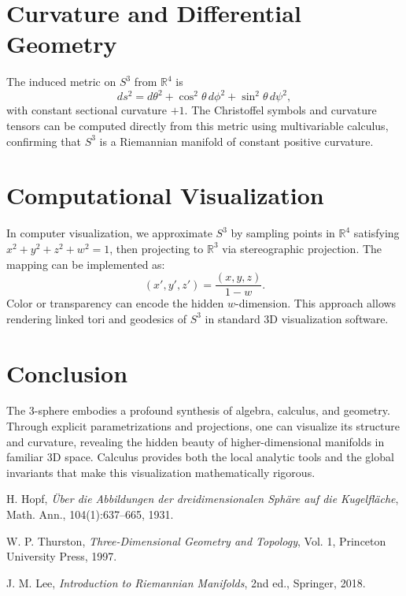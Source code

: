 \documentclass[12pt]{article}
\begin{document}
\section{Curvature and Differential Geometry}
The induced metric on \( S^3 \) from \( \mathbb{R}^4 \) is
\[
ds^2 = d\theta^2 + \cos^2 \theta \, d\phi^2 + \sin^2 \theta \, d\psi^2,
\]
with constant sectional curvature \( +1 \). The Christoffel symbols and curvature tensors can be computed directly from this metric using multivariable calculus, confirming that \( S^3 \) is a Riemannian manifold of constant positive curvature.

\section{Computational Visualization}
In computer visualization, we approximate \( S^3 \) by sampling points in \(\mathbb{R}^4\) satisfying \(x^2 + y^2 + z^2 + w^2 = 1\), then projecting to \(\mathbb{R}^3\) via stereographic projection. The mapping can be implemented as:
\[
(x', y', z') = \frac{(x, y, z)}{1 - w}.
\]
Color or transparency can encode the hidden \(w\)-dimension. This approach allows rendering linked tori and geodesics of \(S^3\) in standard 3D visualization software.

\section{Conclusion}
The 3-sphere embodies a profound synthesis of algebra, calculus, and geometry. Through explicit parametrizations and projections, one can visualize its structure and curvature, revealing the hidden beauty of higher-dimensional manifolds in familiar 3D space. Calculus provides both the local analytic tools and the global invariants that make this visualization mathematically rigorous.

\begin{thebibliography}{9}
H. Hopf, \textit{Über die Abbildungen der dreidimensionalen Sphäre auf die Kugelfläche}, Math. Ann., 104(1):637–665, 1931.

W. P. Thurston, \textit{Three-Dimensional Geometry and Topology}, Vol. 1, Princeton University Press, 1997.

J. M. Lee, \textit{Introduction to Riemannian Manifolds}, 2nd ed., Springer, 2018.
\end{thebibliography}
\end{document}
